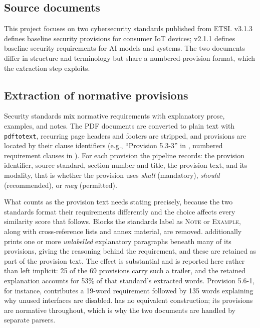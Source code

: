 \subsection{Source documents}

This project focuses on two cybersecurity standards published from ETSI. \standardA{} v3.1.3 defines
baseline security provisions for consumer IoT devices; \standardB{} v2.1.1
defines baseline security requirements for AI models and systems. The two
documents differ in structure and terminology but share a numbered-provision
format, which the extraction step exploits.

\subsection{Extraction of normative provisions}

Security standards mix normative requirements with explanatory prose,
examples, and notes. The PDF documents are converted to plain text
with \texttt{pdftotext}, recurring page headers and footers are stripped, and
provisions are located by their clause identifiers (e.g., ``Provision
5.3-3'' in \standardA{}, numbered requirement clauses in \standardB{}). For
each provision the pipeline records: the provision identifier, source
standard, section number and title, the provision text, and its modality,
that is whether the provision uses \emph{shall} (mandatory), \emph{should}
(recommended), or \emph{may} (permitted).

What counts as the provision text needs stating precisely, because the two
standards format their requirements differently and the choice affects every
similarity score that follows. Blocks the standards label as
\textsc{Note} or \textsc{Example}, along with cross-reference lists and annex
material, are removed. \standardA{} additionally prints one or more
\emph{unlabelled} explanatory paragraphs beneath many of its provisions,
giving the reasoning behind the requirement, and these are retained as part of
the provision text. The effect is substantial and is reported here rather than
left implicit: 25 of the 69 \standardA{} provisions carry such a trailer, and
the retained explanation accounts for 53\% of that standard's extracted words.
Provision 5.6-1, for instance, contributes a 19-word requirement followed by
135 words explaining why unused interfaces are disabled. \standardB{} has no
equivalent construction; its provisions are normative throughout, which is why
the two documents are handled by separate parsers.

